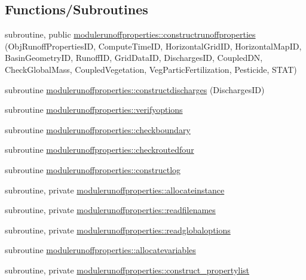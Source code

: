 \subsection*{Functions/\+Subroutines}
\begin{DoxyCompactItemize}
\item 
subroutine, public \mbox{\hyperlink{namespacemodulerunoffproperties_a9b600e1ea55d398dd1ac832de05eccba}{modulerunoffproperties\+::constructrunoffproperties}} (Obj\+Runoff\+Properties\+ID, Compute\+Time\+ID, Horizontal\+Grid\+ID, Horizontal\+Map\+ID, Basin\+Geometry\+ID, Runoff\+ID, Grid\+Data\+ID, Discharges\+ID, Coupled\+DN, Check\+Global\+Mass, Coupled\+Vegetation, Veg\+Partic\+Fertilization, Pesticide, S\+T\+AT)
\item 
subroutine \mbox{\hyperlink{namespacemodulerunoffproperties_af8a32b20348bababc5852a1a5ce34acc}{modulerunoffproperties\+::constructdischarges}} (Discharges\+ID)
\item 
subroutine \mbox{\hyperlink{namespacemodulerunoffproperties_ab4947f5542eb22fb14b5660d0cac5ff1}{modulerunoffproperties\+::verifyoptions}}
\item 
subroutine \mbox{\hyperlink{namespacemodulerunoffproperties_aad3a8c2b2f6443fbd1a8c4ef4f14a275}{modulerunoffproperties\+::checkboundary}}
\item 
subroutine \mbox{\hyperlink{namespacemodulerunoffproperties_aabfeca3506901fe0c3708f17a7affbbd}{modulerunoffproperties\+::checkroutedfour}}
\item 
subroutine \mbox{\hyperlink{namespacemodulerunoffproperties_a5ed964a29d4214b1f4cb89bf338fc96b}{modulerunoffproperties\+::constructlog}}
\item 
subroutine, private \mbox{\hyperlink{namespacemodulerunoffproperties_a41c3c8acac2de4ef4606685a920370db}{modulerunoffproperties\+::allocateinstance}}
\item 
subroutine, private \mbox{\hyperlink{namespacemodulerunoffproperties_afd2d4bbe5b2bb177301ac47d42f33f02}{modulerunoffproperties\+::readfilenames}}
\item 
subroutine, private \mbox{\hyperlink{namespacemodulerunoffproperties_a17a988c6d85ad5ccca32ec7064ede8f2}{modulerunoffproperties\+::readglobaloptions}}
\item 
subroutine \mbox{\hyperlink{namespacemodulerunoffproperties_a2e51076442e9337406704c9d257c24cb}{modulerunoffproperties\+::allocatevariables}}
\item 
subroutine, private \mbox{\hyperlink{namespacemodulerunoffproperties_a442b6b1a6a4cd7b5b27b0fe8c4191f4e}{modulerunoffproperties\+::construct\+\_\+propertylist}}

\end{DoxyCompactItemize}
